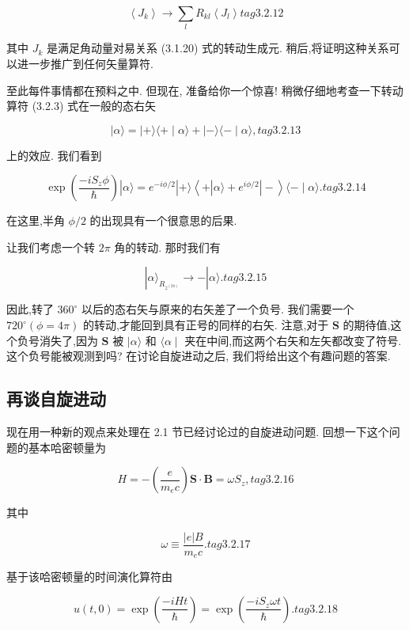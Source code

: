 $$
\left\langle {J}_{k}\right\rangle \rightarrow \mathop{\sum }\limits_{l}{R}_{kl}\left\langle {J}_{l}\right\rangle tag{3.2.12}
$$

其中 ${J}_{k}$ 是满足角动量对易关系 (3.1.20) 式的转动生成元. 稍后,将证明这种关系可以进一步推广到任何矢量算符.

至此每件事情都在预料之中. 但现在, 准备给你一个惊喜! 稍微仔细地考查一下转动算符 (3.2.3) 式在一般的态右矢

$$
\left| {\alpha \rangle = }\right| + \rangle \langle + \mid \alpha \rangle + \mid - \rangle \langle - \mid \alpha \rangle , tag{3.2.13}
$$

上的效应. 我们看到

$$
\exp \left( \frac{-i{S}_{z}\phi }{\hslash }\right) \left| {\alpha \rangle = {e}^{-{i\phi }/2}}\right| + \rangle \left\langle {+\left| {\alpha \rangle + {e}^{{i\phi }/2}}\right| - }\right\rangle \langle - \mid \alpha \rangle . tag{3.2.14}
$$

在这里,半角 $\phi /2$ 的出现具有一个很意思的后果.

让我们考虑一个转 ${2\pi }$ 角的转动. 那时我们有

$$
\left| {\alpha {\rangle }_{{R}_{{z}^{\left( 2\pi \right) }}} \rightarrow - }\right| \alpha \rangle \text{.} tag{3. 2.15}
$$

因此,转了 ${360}^{ \circ }$ 以后的态右矢与原来的右矢差了一个负号. 我们需要一个 ${720}^{ \circ }\left( {\phi = {4\pi }}\right)$ 的转动,才能回到具有正号的同样的右矢. 注意,对于 $\mathbf{S}$ 的期待值,这个负号消失了,因为 $\mathbf{S}$ 被 $|\alpha \rangle$ 和 $\langle \alpha \mid$ 夹在中间,而这两个右矢和左矢都改变了符号. 这个负号能被观测到吗? 在讨论自旋进动之后, 我们将给出这个有趣问题的答案.

\subsection{再谈自旋进动} 

现在用一种新的观点来处理在 2.1 节已经讨论过的自旋进动问题. 回想一下这个问题的基本哈密顿量为

$$
H = - \left( \frac{e}{{m}_{e}c}\right) \mathbf{S} \cdot \mathbf{B} = \omega {S}_{z}, tag{3.2.16}
$$

其中

$$
\omega \equiv \frac{\left| e\right| B}{{m}_{e}c}. tag{3.2.17}
$$

基于该哈密顿量的时间演化算符由

$$
u\left( {t,0}\right) = \exp \left( \frac{-{iHt}}{\hslash }\right) = \exp \left( \frac{-i{S}_{z}{\omega t}}{\hslash }\right) . tag{3. 2.18}
$$

